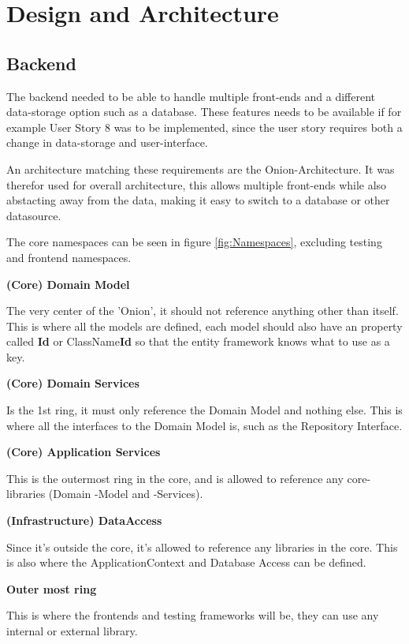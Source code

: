 \chapter{Design and Architecture}

\section{Backend}

The backend needed to be able to handle multiple front-ends and a different data-storage option such as a database. These features needs to be available if for example User Story 8 was to be implemented, since the user story requires both a change in data-storage and user-interface.

An architecture matching these requirements are the Onion-Architecture. It was therefor used for overall architecture, this allows multiple front-ends while also abstacting away from the data, making it easy to switch to a database or other datasource.

The core namespaces can be seen in figure \vref{fig:Namespaces}, excluding testing and frontend namespaces.

\textbf{(Core) Domain Model}
 
The very center of the 'Onion', it should not reference anything other than itself. This is where all the models are defined, each model should also have an property called \textbf{Id} or ClassName\textbf{Id} so that the entity framework knows what to use as a key.

\textbf{(Core) Domain Services}

Is the 1st ring, it must only reference the Domain Model and nothing else. This is where all the interfaces to the Domain Model is, such as the Repository Interface.

\textbf{(Core) Application Services}

This is the outermost ring in the core, and is allowed to reference any core-libraries (Domain -Model and -Services).

\textbf{(Infrastructure) DataAccess}

Since it's outside the core, it's allowed to reference any libraries in the core. This is also where the ApplicationContext and Database Access can be defined. 

\textbf{Outer most ring}

This is where the frontends and testing frameworks will be, they can use any internal or external library.

